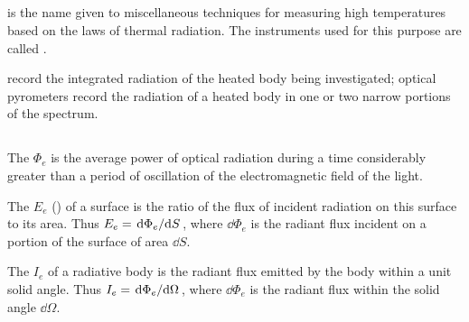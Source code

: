 \subsection{}\label{36.4.1}  is the name given to miscellaneous techniques for measuring high temperatures based on the laws of thermal radiation. The instruments used for this purpose are called .

 record the integrated radiation of the heated body being investigated; optical pyrometers record the radiation of a heated body in one or two narrow portions of the spectrum.

\subsection{}\label{36.4.2} The  $\Phi_{e}$ is the average power of optical radiation  during a time considerably greater than a period of oscillation of the electromagnetic field of the light.

The  $E_{e}$ () of a surface is the ratio of the flux of incident radiation on this surface to its area. Thus $E_{e} = \dv*{\Phi_{e}}{S}$, where $\dd \Phi_{e}$ is the radiant flux incident on a portion
of the surface of area $\dd S$.

The  $I_{e}$ of a radiative body is the radiant flux emitted by the body within a unit solid angle. Thus $I_{e} = \dv*{\Phi_{e}}{\Omega}$, where $\dd \Phi_{e}$ is the radiant flux within the solid angle $\dd \Omega$.

